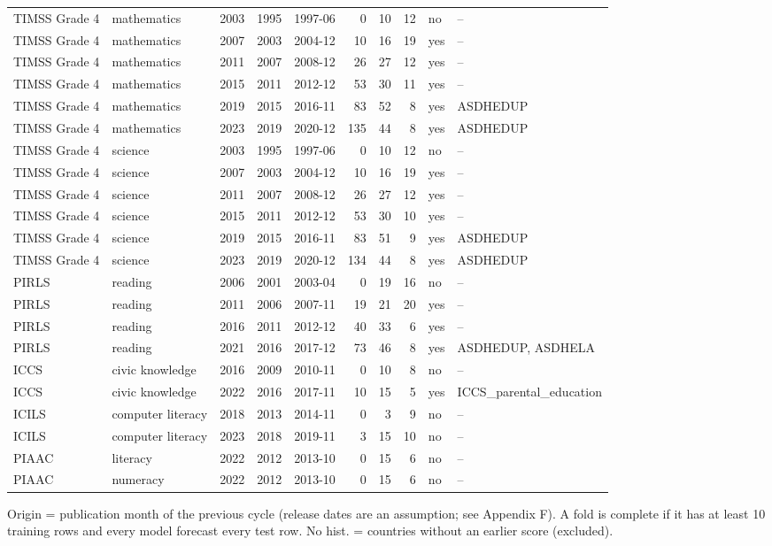 {\begin{longtable}{llrrlrrrlp{4.2cm}}
TIMSS Grade 4 & mathematics & 2003 & 1995 & 1997-06 & 0 & 10 & 12 & no & -- \\
TIMSS Grade 4 & mathematics & 2007 & 2003 & 2004-12 & 10 & 16 & 19 & yes & -- \\
TIMSS Grade 4 & mathematics & 2011 & 2007 & 2008-12 & 26 & 27 & 12 & yes & -- \\
TIMSS Grade 4 & mathematics & 2015 & 2011 & 2012-12 & 53 & 30 & 11 & yes & -- \\
TIMSS Grade 4 & mathematics & 2019 & 2015 & 2016-11 & 83 & 52 & 8 & yes & ASDHEDUP \\
TIMSS Grade 4 & mathematics & 2023 & 2019 & 2020-12 & 135 & 44 & 8 & yes & ASDHEDUP \\
TIMSS Grade 4 & science & 2003 & 1995 & 1997-06 & 0 & 10 & 12 & no & -- \\
TIMSS Grade 4 & science & 2007 & 2003 & 2004-12 & 10 & 16 & 19 & yes & -- \\
TIMSS Grade 4 & science & 2011 & 2007 & 2008-12 & 26 & 27 & 12 & yes & -- \\
TIMSS Grade 4 & science & 2015 & 2011 & 2012-12 & 53 & 30 & 10 & yes & -- \\
TIMSS Grade 4 & science & 2019 & 2015 & 2016-11 & 83 & 51 & 9 & yes & ASDHEDUP \\
TIMSS Grade 4 & science & 2023 & 2019 & 2020-12 & 134 & 44 & 8 & yes & ASDHEDUP \\
PIRLS & reading & 2006 & 2001 & 2003-04 & 0 & 19 & 16 & no & -- \\
PIRLS & reading & 2011 & 2006 & 2007-11 & 19 & 21 & 20 & yes & -- \\
PIRLS & reading & 2016 & 2011 & 2012-12 & 40 & 33 & 6 & yes & -- \\
PIRLS & reading & 2021 & 2016 & 2017-12 & 73 & 46 & 8 & yes & ASDHEDUP, ASDHELA \\
ICCS & civic knowledge & 2016 & 2009 & 2010-11 & 0 & 10 & 8 & no & -- \\
ICCS & civic knowledge & 2022 & 2016 & 2017-11 & 10 & 15 & 5 & yes & ICCS\_parental\_education \\
ICILS & computer literacy & 2018 & 2013 & 2014-11 & 0 & 3 & 9 & no & -- \\
ICILS & computer literacy & 2023 & 2018 & 2019-11 & 3 & 15 & 10 & no & -- \\
PIAAC & literacy & 2022 & 2012 & 2013-10 & 0 & 15 & 6 & no & -- \\
PIAAC & numeracy & 2022 & 2012 & 2013-10 & 0 & 15 & 6 & no & -- \\
\end{longtable}
{\scriptsize Origin = publication month of the previous cycle (release dates are an assumption; see Appendix F). A fold is complete if it has at least 10 training rows and every model forecast every test row. No hist. = countries without an earlier score (excluded).}
}
